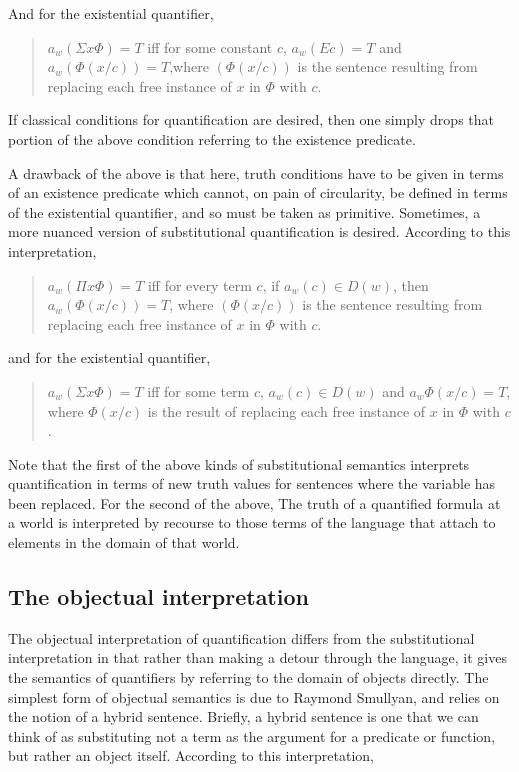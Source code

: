 \documentclass[]{article}
\begin{document}
And for the existential quantifier,

\begin{quote}
$a_{w}(\Sigma x \Phi) = T$ iff for some constant $c$, $a_{w}(Ec) = T$ and $a_{w}(\Phi(x/c)) = T$,where $(\Phi(x/c))$ is the sentence resulting from replacing each free instance of $x$ in $\Phi$ with $c$.
\end{quote}

If classical conditions for quantification are desired, then one simply drops that portion of the above condition referring to the existence predicate.

A drawback of the above is that here, truth conditions have to be given in terms of an existence predicate which cannot, on pain of circularity, be defined in terms of the existential quantifier, and so must be taken as primitive. Sometimes, a more nuanced version of substitutional quantification is desired. According to this interpretation,

\begin{quote}
$a_{w}(\Pi x \Phi) = T$ iff for every term $c$, if $a_{w}(c)\in D(w)$, then $a_{w}(\Phi(x/c)) = T$, where $(\Phi(x/c))$ is the sentence resulting from replacing each free instance of $x$ in $\Phi$ with $c$.
\end{quote}

and for the existential quantifier, 

\begin{quote}
$a_{w} (\Sigma x \Phi) = T$ iff for some term $c$, $a_{w}(c) \in D(w)$ and $a_{w}\Phi(x/c) = T$, where $\Phi(x/c)$ is the result of replacing each free instance of $x$ in $\Phi$ with $c$.
\end{quote}

Note that the first of the above kinds of substitutional semantics interprets quantification in terms of new truth values for sentences where the variable has been replaced. For the second of the above, The truth of a quantified formula at a world is interpreted by recourse to those terms of the language that attach to elements in the domain of that world.
\subsection{The objectual interpretation}
The objectual interpretation of quantification differs from the substitutional interpretation in that rather than making a detour through the language, it gives the semantics of quantifiers by referring to the domain of objects directly. The simplest form of objectual semantics is due to Raymond Smullyan, and relies on the notion of a hybrid sentence. Briefly, a hybrid sentence is one that we can think of as substituting not a term as the argument for a predicate or function, but rather an object itself. According to this interpretation, 
\end{document}
